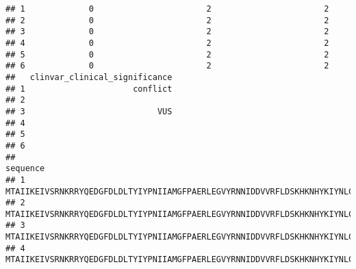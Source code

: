 \documentclass[
]{article}
\begin{document}
\begin{verbatim}
## 1             0                       2                       2
## 2             0                       2                       2
## 3             0                       2                       2
## 4             0                       2                       2
## 5             0                       2                       2
## 6             0                       2                       2
##   clinvar_clinical_significance
## 1                      conflict
## 2                              
## 3                           VUS
## 4                              
## 5                              
## 6                              
##                                                                                                                                                                                                                                                                                                                                                                                                              sequence
## 1 MTAIIKEIVSRNKRRYQEDGFDLDLTYIYPNIIAMGFPAERLEGVYRNNIDDVVRFLDSKHKNHYKIYNLCAERHYDTAKFNCRVAQYPFEDHNPPQLELIKPFCEDLDQWLSEDDNHVAAIHCKAGKGRTGVMICAYLLHRGKFLKAQEALDFYGEVRTRDKKGVTIPSQRRYVYYYSYLLKNHLDYRPVALLFHKMMFETIPMFSGGTCNPQFVVCQLKVKIYSSNSGPTRREDKFMYFEFPQPLPVCGDIKVEFFHKQNKMLKKDKMFHFWVNTFFIPGPEETSEKVENGSLCDQEIDSICSIERADNDKEYLVLTLTKNDLDKANKDKANRYFSPNFKVKLYFTKTVEEPSNPEASSSTSVTPDVSDNEPDHYRYSDTTDSDPENEPFDEDQHTQITKV
## 2 MTAIIKEIVSRNKRRYQEDGFDLDLTYIYPNIIAMGFPAERLEGVYRNNIDDVVRFLDSKHKNHYKIYNLCAERHYDTAKFNCRVAQYPFEDHNPPQLELIKPFCEDLDQWLSEDDNHVAAIHCKAGKGRTGVMICAYLLHRGKFLKAQEALDFYGEVRTRDKKGVTIPSQRRYVYYYSYLLKNHLDYRPVALLFHKMMFETIPMFSGGTCNPQFVVCQLKVKIYSSNSGPTRREDKFMYFEFPQPLPVCGDIKVEFFHKQNKMLKKDKMFHFWVNTFFIPGPEETSEKVENGSLCDQEIDSICSIERADNDKEYLVLTLTKNDLDKANKDKANRYFSPNFKVKLYFTKTVEEPSNPEASSSTSVTPDVSDNEPDHYRYSDTTDSDPENEPFDEDQHTQITKV
## 3 MTAIIKEIVSRNKRRYQEDGFDLDLTYIYPNIIAMGFPAERLEGVYRNNIDDVVRFLDSKHKNHYKIYNLCAERHYDTAKFNCRVAQYPFEDHNPPQLELIKPFCEDLDQWLSEDDNHVAAIHCKAGKGRTGVMICAYLLHRGKFLKAQEALDFYGEVRTRDKKGVTIPSQRRYVYYYSYLLKNHLDYRPVALLFHKMMFETIPMFSGGTCNPQFVVCQLKVKIYSSNSGPTRREDKFMYFEFPQPLPVCGDIKVEFFHKQNKMLKKDKMFHFWVNTFFIPGPEETSEKVENGSLCDQEIDSICSIERADNDKEYLVLTLTKNDLDKANKDKANRYFSPNFKVKLYFTKTVEEPSNPEASSSTSVTPDVSDNEPDHYRYSDTTDSDPENEPFDEDQHTQITKV
## 4 MTAIIKEIVSRNKRRYQEDGFDLDLTYIYPNIIAMGFPAERLEGVYRNNIDDVVRFLDSKHKNHYKIYNLCAERHYDTAKFNCRVAQYPFEDHNPPQLELIKPFCEDLDQWLSEDDNHVAAIHCKAGKGRTGVMICAYLLHRGKFLKAQEALDFYGEVRTRDKKGVTIPSQRRYVYYYSYLLKNHLDYRPVALLFHKMMFETIPMFSGGTCNPQFVVCQLKVKIYSSNSGPTRREDKFMYFEFPQPLPVCGDIKVEFFHKQNKMLKKDKMFHFWVNTFFIPGPEETSEKVENGSLCDQEIDSICSIERADNDKEYLVLTLTKNDLDKANKDKANRYFSPNFKVKLYFTKTVEEPSNPEASSSTSVTPDVSDNEPDHYRYSDTTDSDPENEPFDEDQHTQITKV

\end{verbatim}
\end{document}
